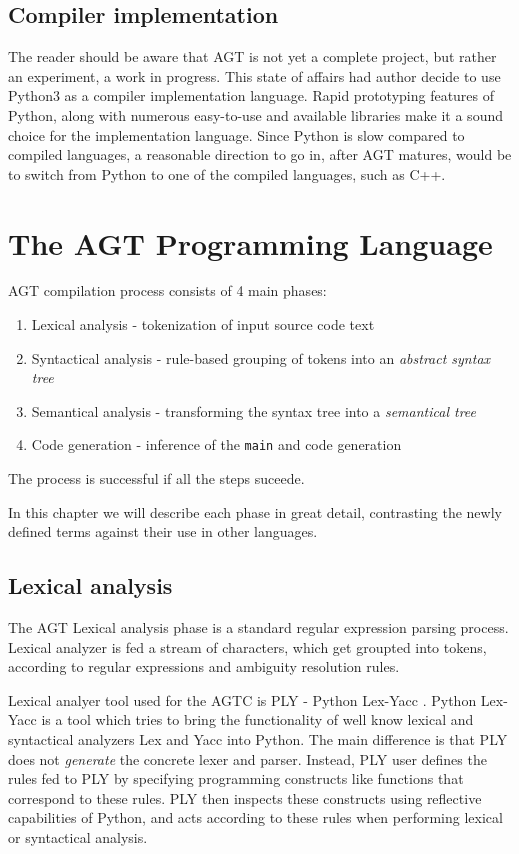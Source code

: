 \documentclass[times, utf8, diplomski]{fer}
\theoremstyle{definition}
\begin{document}
\section{Compiler implementation}

The reader should be aware that AGT is not yet a complete project, but rather an experiment, 
a work in progress. This state of affairs had author decide to use Python3 as a compiler implementation
language. Rapid prototyping features of Python, along with numerous easy-to-use and available libraries
make it a sound choice for the implementation language. Since Python is slow compared to compiled
languages, a reasonable direction to go in, after AGT matures, would be to switch from Python
to one of the compiled languages, such as C++.

\chapter{The AGT Programming Language}\label{chap:indepth}

AGT compilation process consists of 4 main phases: 

\begin{enumerate}
\item Lexical analysis - tokenization of input source code text
\item Syntactical analysis - rule-based grouping of tokens into an \textit{abstract syntax tree}
\item Semantical analysis - transforming the syntax tree into a \textit{semantical tree}
\item Code generation - inference of the \texttt{main} and code generation
\end{enumerate}

The process is successful if all the steps suceede.

In this chapter we will describe each phase in great detail, contrasting the
newly defined terms against their use in other languages.

\section{Lexical analysis}

The AGT Lexical analysis phase is a standard regular expression parsing process.
Lexical analyzer is fed a stream of characters, which get groupted into tokens,
according to regular expressions and ambiguity resolution rules.

Lexical analyer tool used for the AGTC is PLY - Python Lex-Yacc \citep{c_ply_beazley}.
Python Lex-Yacc is a tool which tries to bring the functionality of well know
lexical and syntactical analyzers Lex and Yacc into Python. The main difference
is that PLY does not \textit{generate} the 
concrete lexer and parser. Instead, PLY user defines the rules fed to PLY by
specifying programming 
constructs like functions that correspond to these rules. PLY then inspects these constructs using 
reflective capabilities of Python, and acts according to these rules
when performing lexical or syntactical analysis.
\end{document}
